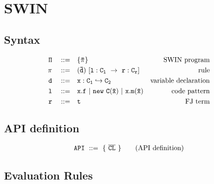\documentclass[letterpaper]{article}
\begin{document}
\begin{center}
\noLine
{}
\DP
\end{center}


\section{SWIN}
\subsection{Syntax}
\begin{align*}
  \tt \Pi \quad ::=\quad  &\tt  \{\bar{\pi}\}                     & \text{SWIN program}\\
  \tt \pi \quad ::=\quad  &\tt  (\bar{d})\ [l:C_l\ \rightarrow\ r:C_r]    & \text{rule}\\
  \tt d   \quad ::=\quad  &\tt  x:C_1\hookrightarrow C_2          & \text{variable declaration}\\
  \tt l   \quad ::=\quad  &\tt  x.f ~ | ~ new\ C(\bar{x}) ~|~ x.m(\bar{x})  &\text{code pattern}\\
  \tt r   \quad ::=\quad  &\tt  t                                 & \text{FJ term}
\end{align*}

\subsection{API definition}
\begin{align*}
 \tt API ~ ::=\tt ~ \{ ~ \overline{CL} ~ \}\qquad\text{(API definition)}\\
\end{align*}

\subsection{Evaluation Rules}
\begin{center}
                             
\DP
\end{center}
\vspace{2pt}
\end{document}
